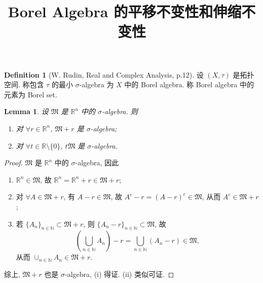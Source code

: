 \documentclass[a4paper,11pt]{article}
\title{Borel Algebra 的平移不变性和伸缩不变性}
\newtheorem{lemma}[theorem]{Lemma}
\theoremstyle{definition}
\newtheorem{definition}[theorem]{Definition}
\begin{document}
\begin{CJK*}{UTF8}{gbsn}

\maketitle

\begin{definition}[W. Rudin, Real and Complex Analysis, p.12]
    设 $ (X, \tau) $ 是拓扑空间. 称包含 $ \tau $ 的最小 $ \sigma $-algebra 为 $ X $ 中的 Borel algebra. 
    称 Borel algebra 中的元素为 Borel set.
\end{definition}

\begin{lemma} \label{lem}
    设 $ \mathfrak{M} $ 是 $ \mathbb{R}^n $ 中的 $ \sigma $-algebra. 则
    \begin{enumerate}[{\rm (i)}]
        \item 对 $ \forall r \in \mathbb{R}^n $, $ \mathfrak{M} + r $ 是 $ \sigma $-algebra;
        \item 对 $ \forall t \in \mathbb{R} \setminus \{0\} $, $ t\mathfrak{M} $ 是 $ \sigma $-algebra.
    \end{enumerate}
\end{lemma}

\begin{proof}
    $ \mathfrak{M} $ 是 $ \mathbb{R}^n $ 中的 $ \sigma $-algebra, 因此
    
    \begin{enumerate}[{\rm (i)}]
        \item $ \mathbb{R}^n \in \mathfrak{M} $, 故 $ \mathbb{R}^n = \mathbb{R}^n + r \in \mathfrak{M} + r $;
        
        \item 对 $ \forall A \in \mathfrak{M} + r $, 有 $ A - r \in \mathfrak{M} $, 故
        $ A^c - r = (A - r)^c \in \mathfrak{M} $, 从而 $ A^c \in \mathfrak{M} + r $;
        
        \item 若 $ \{A_n\}_{n \in \mathbb{N}} \subset \mathfrak{M} + r $, 则
        $ \{A_n - r \}_{n \in \mathbb{N}} \subset \mathfrak{M} $, 故
        $$ 
            \left( \bigcup_{n \in \mathbb{N}} A_n \right) - r 
                = \bigcup_{n \in \mathbb{N}} (A_n - r) \in \mathfrak{M},
        $$
        从而 $ \cup_{n \in \mathbb{N}} A_n \in \mathfrak{M} + r $.
    \end{enumerate}
    
    综上, $ \mathfrak{M} + r $ 也是 $ \sigma $-algebra, (i) 得证. 
    (ii) 类似可证.
\end{proof}


\end{CJK*}
\end{document}
